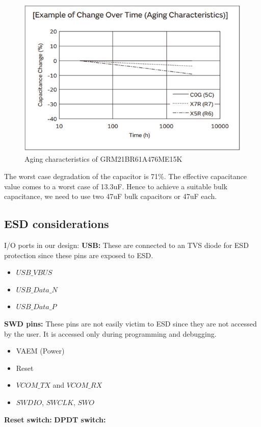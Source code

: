 \documentclass[a4paper,11pt]{article}%
\begin{document}
    \begin{figure}[H]
        \centering
        \includegraphics[width=\textwidth]{figures/Update5/Aging characteristics of capacitor.png}
        \caption{Aging characteristics of GRM21BR61A476ME15K}
    \end{figure}

    The worst case degradation of the capacitor is 71\%. The effective capacitance value comes to a worst case of 13.3uF.
    Hence to achieve a suitable bulk capacitance, we need to use two 47uF bulk capacitors or 47uF each. 

\subsection{ESD considerations}

I/O ports in our design:
\textbf{USB:} These are connected to an TVS diode for ESD protection since these pins are exposed to ESD. 
\begin{itemize}
    \item $USB\_VBUS$
    \item $USB\_Data\_N$
    \item $USB\_Data\_P$
\end{itemize}
\textbf{SWD pins:} These pins are not easily victim to ESD since they are not accessed by the user. It is accessed only during programming and debugging. 
\begin{itemize}
    \item {VAEM (Power)}
    \item {Reset}
    \item $VCOM\_TX$ and $VCOM\_RX$
    \item $SWDIO$, $SWCLK$, $SWO$
\end{itemize}
\textbf{Reset switch:}
\textbf{DPDT switch:}
\end{document}

